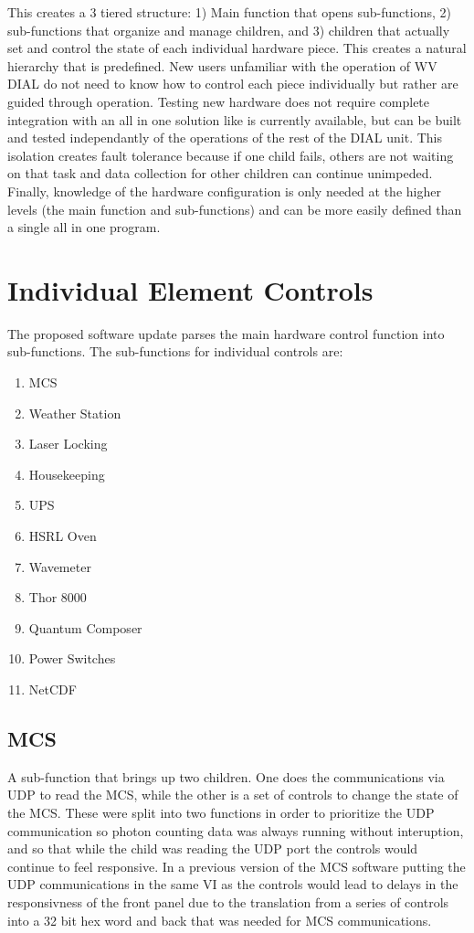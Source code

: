 This creates a 3 tiered structure: 1) Main function that opens sub-functions, 2) sub-functions that organize and manage children, and 3) children that actually set and control the state of each individual hardware piece. This creates a natural hierarchy that is predefined. New users unfamiliar with the operation of WV DIAL do not need to know how to control each piece individually but rather are guided through operation. Testing new hardware does not require complete integration with an all in one solution like is currently available, but can be built and tested independantly of the operations of the rest of the DIAL unit. This isolation creates fault tolerance because if one child fails, others are not waiting on that task and data collection for other children can continue unimpeded. Finally, knowledge of the hardware configuration is only needed at the higher levels (the main function and sub-functions) and can be more easily defined than a single all in one program. 

\section{Individual Element Controls}
The proposed software update parses the main hardware control function into sub-functions. The sub-functions for individual controls are:

\begin{enumerate}
\item{MCS}
\item{Weather Station}
\item{Laser Locking}
\item{Housekeeping}
\item{UPS}
\item{HSRL Oven}
\item{Wavemeter}
\item{Thor 8000}
\item{Quantum Composer}
\item{Power Switches}
\item{NetCDF}
\end{enumerate}

\subsection{MCS}\label{Sec:MCSSubFunction}

A sub-function that brings up two children. One does the communications via UDP to read the MCS, while the other is a set of controls to change the state of the MCS. These were split into two functions in order to prioritize the UDP communication so photon counting data was always running without interuption, and so that while the child was reading the UDP port the controls would continue to feel responsive. In a previous version of the MCS software putting the UDP communications in the same VI as the controls would lead to delays in the responsivness of the front panel due to the translation from a series of controls into a 32 bit hex word and back that was needed for MCS communications. 

